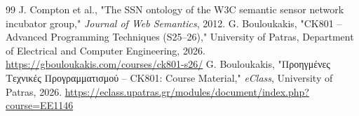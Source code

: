 \documentclass[acmsmall,screen,nonacm]{acmart}
\begin{document}
	\begin{thebibliography}{99}
		 J. Compton et al., "The SSN ontology of the W3C semantic sensor network incubator group," \emph{Journal of Web Semantics}, 2012.
		  G. Bouloukakis, "CK801 -- Advanced Programming Techniques (S25--26)," University of Patras, Department of Electrical and Computer Engineering, 2026.  \url{https://gbouloukakis.com/courses/ck801-s26/}
		  G. Bouloukakis, "Προηγμένες Τεχνικές Προγραμματισμού -- CK801: Course Material," \emph{eClass}, University of Patras, 2026. \url{https://eclass.upatras.gr/modules/document/index.php?course=EE1146}
		 
	\end{thebibliography}
	
\end{document}
